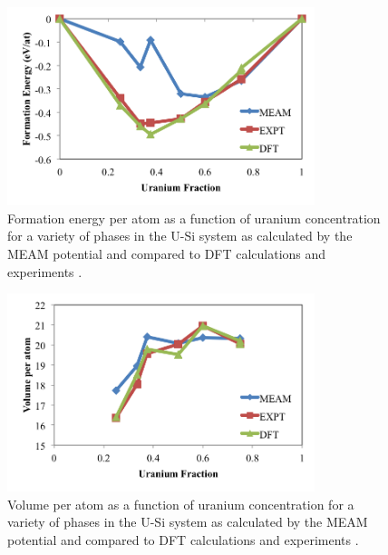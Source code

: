 \documentclass[review]{elsarticle}
\begin{document}
\begin{figure}[hbt]
	\centering
	\includegraphics[width=0.8\textwidth]{EvsC_KK1.png}
    \caption{Formation energy per atom as a function of uranium concentration for a variety of phases in the U-Si system as calculated by the MEAM potential and compared to DFT calculations \cite{noordhoek2016} and experiments \cite{berche2009}.}\label{fig:eform3}
\end{figure}

 \begin{figure}[hbt]
	\centering
	\includegraphics[width=0.8\textwidth]{VvsC_KK1.png}
    \caption{Volume per atom as a function of uranium concentration for a variety of phases in the U-Si system as calculated by the MEAM potential and compared to DFT calculations \cite{noordhoek2016} and experiments \cite{berche2009}.}\label{fig:vol3}
\end{figure}
\end{document}
